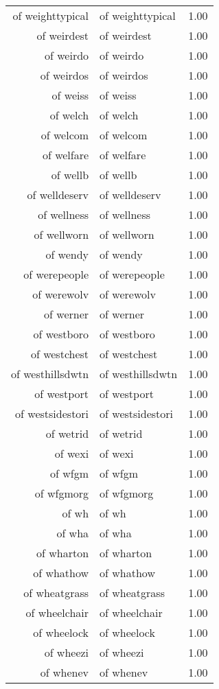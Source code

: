 \begin{table}[ht]
\begin{tabular}{rlr}
  of weighttypical & of weighttypical & 1.00 \\ 
  of weirdest & of weirdest & 1.00 \\ 
  of weirdo & of weirdo & 1.00 \\ 
  of weirdos & of weirdos & 1.00 \\ 
  of weiss & of weiss & 1.00 \\ 
  of welch & of welch & 1.00 \\ 
  of welcom & of welcom & 1.00 \\ 
  of welfare & of welfare & 1.00 \\ 
  of wellb & of wellb & 1.00 \\ 
  of welldeserv & of welldeserv & 1.00 \\ 
  of wellness & of wellness & 1.00 \\ 
  of wellworn & of wellworn & 1.00 \\ 
  of wendy & of wendy & 1.00 \\ 
  of werepeople & of werepeople & 1.00 \\ 
  of werewolv & of werewolv & 1.00 \\ 
  of werner & of werner & 1.00 \\ 
  of westboro & of westboro & 1.00 \\ 
  of westchest & of westchest & 1.00 \\ 
  of westhillsdwtn & of westhillsdwtn & 1.00 \\ 
  of westport & of westport & 1.00 \\ 
  of westsidestori & of westsidestori & 1.00 \\ 
  of wetrid & of wetrid & 1.00 \\ 
  of wexi & of wexi & 1.00 \\ 
  of wfgm & of wfgm & 1.00 \\ 
  of wfgmorg & of wfgmorg & 1.00 \\ 
  of wh & of wh & 1.00 \\ 
  of wha & of wha & 1.00 \\ 
  of wharton & of wharton & 1.00 \\ 
  of whathow & of whathow & 1.00 \\ 
  of wheatgrass & of wheatgrass & 1.00 \\ 
  of wheelchair & of wheelchair & 1.00 \\ 
  of wheelock & of wheelock & 1.00 \\ 
  of wheezi & of wheezi & 1.00 \\ 
  of whenev & of whenev & 1.00 \\ 

\end{tabular}
\end{table}
